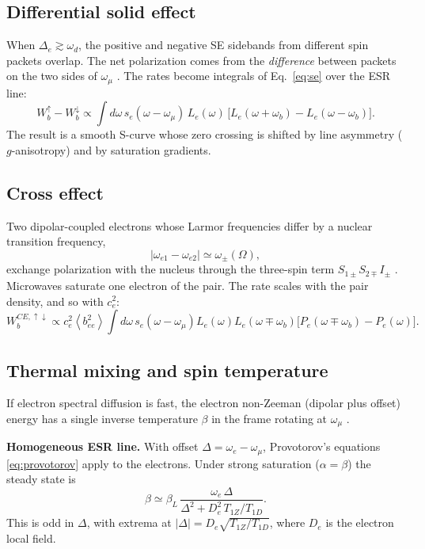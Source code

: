 \documentclass[11pt]{article}
\newcommand{\avg}[1]{\left\langle #1\right\rangle}
\begin{document}
\subsection{Differential solid effect}
When $\Delta_e\gtrsim\omega_d$, the positive and negative SE sidebands from different spin
packets overlap. The net polarization comes from the \emph{difference} between packets on the
two sides of $\omega_\mu$ \cite{Wenckebach2016}. The rates become integrals of
Eq.~\eqref{eq:se} over the ESR line:
\begin{equation}
W_b^{\uparrow}-W_b^{\downarrow}\propto
\int d\omega\,s_e(\omega-\omega_\mu)\,L_e(\omega)\,
\big[L_e(\omega+\omega_b)-L_e(\omega-\omega_b)\big].
\end{equation}
The result is a smooth S-curve whose zero crossing is shifted by line asymmetry
($g$-anisotropy) and by saturation gradients.

\subsection{Cross effect}
Two dipolar-coupled electrons whose Larmor frequencies differ by a nuclear transition
frequency,
\[
|\omega_{e1}-\omega_{e2}|\simeq\omega_\pm(\Omega),
\]
exchange polarization with the nucleus through the three-spin term
$S_{1\pm}S_{2\mp}I_{\pm}$ \cite{Hovav2012,Wenckebach2016}. Microwaves saturate one electron of
the pair. The rate scales with the pair density, and so with $c_e^2$:
\begin{equation}
W^{CE,\uparrow\downarrow}_b\propto c_e^2\avg{b_{ee}^2}\!\int\! d\omega\,s_e(\omega-\omega_\mu)L_e(\omega)L_e(\omega\mp\omega_b)
\big[P_e(\omega\mp\omega_b)-P_e(\omega)\big].
\end{equation}

\subsection{Thermal mixing and spin temperature}
\label{sec:tm}
If electron spectral diffusion is fast, the electron non-Zeeman (dipolar plus offset) energy
has a single inverse temperature $\beta$ in the frame rotating at $\omega_\mu$
\cite{Provotorov1962,Borghini1968,AbragamGoldman1978,Goldman1970}.

\textbf{Homogeneous ESR line.} With offset $\Delta=\omega_e-\omega_\mu$, Provotorov's equations
\eqref{eq:provotorov} apply to the electrons. Under strong saturation ($\alpha=\beta$) the
steady state is
\begin{equation}
\beta\simeq\beta_L\,\frac{\omega_e\,\Delta}{\Delta^2+D_e^2\,T_{1Z}/T_{1D}} .
\label{eq:tmhomog}
\end{equation}
This is odd in $\Delta$, with extrema at $|\Delta|=D_e\sqrt{T_{1Z}/T_{1D}}$, where $D_e$ is the
electron local field.
\end{document}
